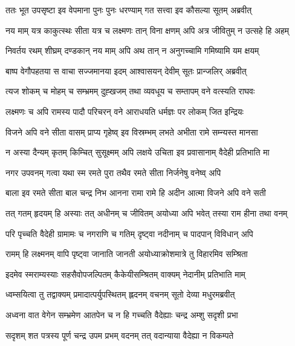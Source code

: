 
\twolineshloka
{ततः भूत उपसृष्टा इव वेपमाना पुनः पुनः}
{धरण्याम् गत सत्त्वा इव कौसल्या सूतम् अब्रवीत्} %

\twolineshloka
{नय माम् यत्र काकुत्स्थः सीता यत्र च लक्ष्मणः}
{तान् विना क्षणम् अपि अत्र जीवितुम् न उत्सहे हि अहम्} %

\twolineshloka
{निवर्तय रथम् शीघ्रम् दण्डकान् नय माम् अपि}
{अथ तान् न अनुगच्चामि गमिष्यामि यम क्षयम्} %

\twolineshloka
{बाष्प वेगौपहतया स वाचा सज्जमानया}
{इदम् आश्वासयन् देवीम् सूतः प्रान्जलिर् अब्रवीत्} %

\twolineshloka
{त्यज शोकम् च मोहम् च सम्भ्रमम् दुह्खजम् तथा}
{व्यवधूय च सम्तापम् वने वत्स्यति राघवः} %

\twolineshloka
{लक्ष्मणः च अपि रामस्य पादौ परिचरन् वने}
{आराधयति धर्मज्ञः पर लोकम् जित इन्द्रियः} %

\twolineshloka
{विजने अपि वने सीता वासम् प्राप्य गृहेष्व् इव}
{विस्रम्भम् लभते अभीता रामे सम्न्यस्त मानसा} %

\twolineshloka
{न अस्या दैन्यम् कृतम् किम्चित् सुसूक्ष्मम् अपि लक्षये}
{उचिता इव प्रवासानाम् वैदेही प्रतिभाति मा} %

\twolineshloka
{नगर उपवनम् गत्वा यथा स्म रमते पुरा}
{तथैव रमते सीता निर्जनेषु वनेष्व् अपि} %

\twolineshloka
{बाला इव रमते सीता बाल चन्द्र निभ आनना}
{रामा रामे हि अदीन आत्मा विजने अपि वने सती} %

\twolineshloka
{तत् गतम् हृदयम् हि अस्याः तत् अधीनम् च जीवितम्}
{अयोध्या अपि भवेत् तस्या राम हीना तथा वनम्} %

\twolineshloka
{परि पृच्चति वैदेही ग्रामामः च नगराणि च}
{गतिम् दृष्ट्वा नदीनाम् च पादपान् विविधान् अपि} %

\twolineshloka
{रामम् हि लक्ष्मनम् वापि पृष्ट्वा जानाति जानती}
{अयोध्याक्रोशमात्रे तु विहारमिव सम्श्रिता} %

\twolineshloka
{इदमेव स्मराम्यस्याः सहसैवोपजल्पितम्}
{कैकेयीसम्श्रितम् वाक्यम् नेदानीम् प्रतिभाति माम्} %

\twolineshloka
{ध्वम्सयित्वा तु तद्वाक्यम् प्रमादात्पर्युपस्थितम्}
{ह्लदनम् वचनम् सूतो देव्या मधुरमब्रवीत्} %

\twolineshloka
{अध्वना वात वेगेन सम्भ्रमेण आतपेन च}
{न हि गच्चति वैदेह्याः चन्द्र अम्शु सदृशी प्रभा} %

\twolineshloka
{सदृशम् शत पत्रस्य पूर्ण चन्द्र उपम प्रभम्}
{वदनम् तत् वदान्याया वैदेह्या न विकम्पते} %

